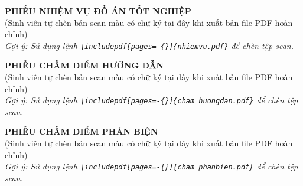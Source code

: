 \documentclass[12pt,a4paper]{article}
\begin{document}
\thispagestyle{empty}
\begin{center}
  \vspace*{5cm}
  {\Huge \textbf{PHIẾU NHIỆM VỤ ĐỒ ÁN TỐT NGHIỆP}} \\
  \vspace{1.5cm}
  {\large (Sinh viên tự chèn bản scan màu có chữ ký tại đây khi xuất bản file PDF hoàn chỉnh)} \\
  \vspace{2cm}
  \textit{Gợi ý: Sử dụng lệnh \texttt{\textbackslash includepdf[pages=-\{\}]\{nhiemvu.pdf\}} để chèn tệp scan.}
\end{center}
\newpage

\thispagestyle{empty}
\begin{center}
  \vspace*{5cm}
  {\Huge \textbf{PHIẾU CHẤM ĐIỂM HƯỚNG DẪN}} \\
  \vspace{1.5cm}
  {\large (Sinh viên tự chèn bản scan màu có chữ ký tại đây khi xuất bản file PDF hoàn chỉnh)} \\
  \vspace{2cm}
  \textit{Gợi ý: Sử dụng lệnh \texttt{\textbackslash includepdf[pages=-\{\}]\{cham\_huongdan.pdf\}} để chèn tệp scan.}
\end{center}
\newpage

\thispagestyle{empty}
\begin{center}
  \vspace*{5cm}
  {\Huge \textbf{PHIẾU CHẤM ĐIỂM PHẢN BIỆN}} \\
  \vspace{1.5cm}
  {\large (Sinh viên tự chèn bản scan màu có chữ ký tại đây khi xuất bản file PDF hoàn chỉnh)} \\
  \vspace{2cm}
  \textit{Gợi ý: Sử dụng lệnh \texttt{\textbackslash includepdf[pages=-\{\}]\{cham\_phanbien.pdf\}} để chèn tệp scan.}
\end{center}
\newpage


\newpage

\newpage

\newpage

\tableofcontents
\newpage

{}
\listoffigures
\newpage

{}
\listoftables
\newpage

\setcounter{page}{1}


\newpage

\newpage

\newpage

\newpage

\newpage

\newpage

\newpage

\newpage
\nocite{*}  


\end{document}
